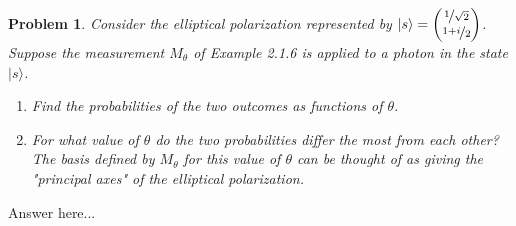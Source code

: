 \documentclass[12pt]{article}
\newenvironment{answer}
    {\begin{adjustwidth}{0pt}{0pt}}
    {\end{adjustwidth}}
\newtheorem{problem}{Problem}
\theoremstyle{remark}  %
\begin{document}
\begin{problem}
    Consider the elliptical polarization represented by $|s\rangle = \begin{pmatrix}
        \nicefrac{1}{\sqrt{2}} \\
        \nicefrac{1+i}{2}
    \end{pmatrix}$. Suppose the measurement $M_\theta$ of Example 2.1.6 is applied to a photon in the state $|s\rangle$.
    \begin{enumerate}[label=(\alph*)]
        \item Find the probabilities of the two outcomes as functions of $\theta$.
        \item For what value of $\theta$ do the two probabilities differ the most from each other? The basis defined by $M_\theta$ for this value of $\theta$ can be thought of as giving the "principal axes" of the elliptical polarization.
    \end{enumerate}
\end{problem}
\begin{answer}
    Answer here...
\end{answer}
\end{document}
